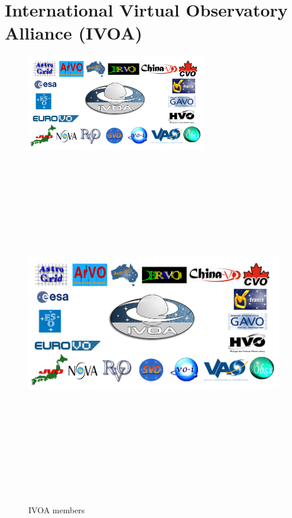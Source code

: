     
\section{International Virtual Observatory Alliance (IVOA)}

   \begin{figure}
     \vspace{0pt}
     \begin{center}
       \ifpdf
       \includegraphics[width=0.7\textwidth]{ivoamembers}
       \else
       \includegraphics[bb = 92 86 545 742, height=6in]{ivoamembers.jpg}
       \fi
     \end{center}
     \vspace{-20pt}
     \caption{IVOA members}
     \vspace{-10pt}
   \end{figure}


